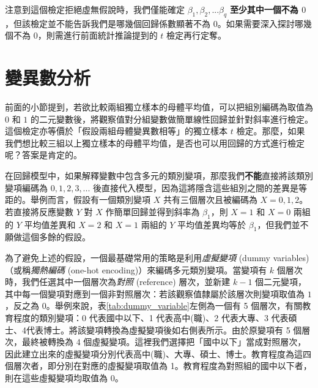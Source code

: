     \medskip
    
    注意到這個檢定拒絕虛無假說時，我們僅能確定 $\beta_1, \beta_2, ... \beta_q$ \textbf{至少其中一個不為 $0$}，但該檢定並不能告訴我們是哪幾個回歸係數顯著不為 $0$。如果需要深入探討哪幾個不為 $0$，則需進行前面統計推論提到的 $t$ 檢定再行定奪。


\section{變異數分析}
    前面的小節提到，若欲比較兩組獨立樣本的母體平均值，可以把組別編碼為取值為 $0$ 和 $1$ 的二元變數後，將觀察值對分組變數做簡單線性回歸並針對斜率進行檢定。這個檢定亦等價於「假設兩組母體變異數相等」的獨立樣本 $t$ 檢定。那麼，如果我們想比較三組以上獨立樣本的母體平均值，是否也可以用回歸的方式進行檢定呢？答案是肯定的。

    \medskip
    
    在回歸模型中，如果解釋變數中包含多元的類別變項，那麼我們\textbf{不能}直接將該類別變項編碼為 $0, 1, 2, 3,...$ 後直接代入模型，因為這將隱含這些組別之間的差異是等距的。舉例而言，假設有一個類別變項 $X$ 共有三個層次且被編碼為 $X = 0, 1, 2$。若直接將反應變數 $Y$ 對 $X$ 作簡單回歸並得到斜率為 $\beta_1$，則 $X=1$ 和 $X=0$ 兩組的 $Y$ 平均值差異和 $X=2$ 和 $X=1$ 兩組的 $Y$ 平均值差異均等於 $\beta_1$，但我們並不願做這個多餘的假設。

    \medskip
    
    為了避免上述的假設，一個最基礎常用的策略是利用\textit{虛擬變項} (dummy variables)（或稱\textit{獨熱編碼} (one-hot encoding)）來編碼多元類別變項。當變項有 $k$ 個層次時，我們任選其中一個層次為\textit{對照} (reference) 層次，並新建 $k-1$ 個二元變項，其中每一個變項對應到一個非對照層次：若該觀察值隸屬於該層次則變項取值為 $1$，反之為 $0$。舉例來說，表\ref{tab:dummy_variable}左側為一個有 5 個層次，有關教育程度的類別變項：0 代表國中以下、1 代表高中(職)、2 代表大專、3 代表碩士、4代表博士。將該變項轉換為虛擬變項後如右側表所示。由於原變項有 5 個層次，最終被轉換為 4 個虛擬變項。這裡我們選擇把「國中以下」當成對照層次，因此建立出來的虛擬變項分別代表高中(職)、大專、碩士、博士。教育程度為這四個層次者，即分別在對應的虛擬變項取值為 1。教育程度為對照組的國中以下者，則在這些虛擬變項均取值為 0。

